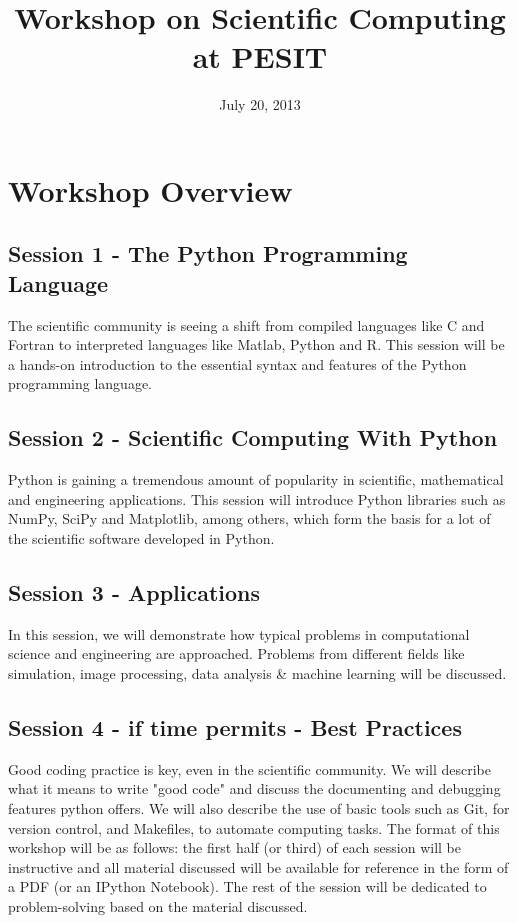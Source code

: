 \documentclass{article}
\begin{document}
\title{Workshop on Scientific Computing at PESIT}
\date{July 20, 2013}
\maketitle
\section*{Workshop Overview}
\subsection*{Session 1 - The Python Programming Language}
The scientific community is seeing a shift from compiled languages like C and 
Fortran to interpreted languages like Matlab, Python and R. This session will be
a hands-on introduction to the essential syntax and features of the Python
programming language.

\subsection*{Session 2 - Scientific Computing With Python}
Python is gaining a tremendous amount of popularity in scientific, mathematical 
and engineering applications. This session will introduce Python libraries such
as NumPy, SciPy and Matplotlib, among others, which form the basis for a lot 
of the scientific software developed in Python. 

\subsection*{Session 3 - Applications}
In this session, we will demonstrate how typical problems in computational science and
engineering are approached. Problems from different fields like simulation,
image processing, data analysis \& machine learning will be discussed.


\subsection*{Session 4 - if time permits - Best Practices}
Good coding practice is key, even in the scientific community. We will describe
what it means to write "good code" and discuss the documenting and debugging 
features python offers. We will also describe the use of basic tools such as Git, 
for version control, and Makefiles, to automate computing tasks.
\newline \newline
The format of this workshop will be as follows: the first half (or third) of 
each session will be instructive and all material discussed will be available for
reference in the form of a PDF (or an IPython Notebook). The rest of the session
will be dedicated to problem-solving based on the material discussed.
\end{document}
